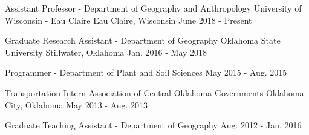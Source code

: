\begin{cventries}
  \cventry
    {Assistant Professor - Department of Geography and Anthropology}
    {University of Wisconsin - Eau Claire}
    {Eau Claire, Wisconsin}
    {June 2018 - Present}

  \cventry
    {Graduate Research Assistant - Department of Geography}
    {Oklahoma State University}
    {Stillwater, Oklahoma}
    {Jan. 2016 - May 2018}

  \cventry
    {Programmer - Department of Plant and Soil Sciences}
    {}
    {}
    {May 2015 - Aug. 2015}

  \cventry
    {Transportation Intern}
    {Association of Central Oklahoma Governments}
    {Oklahoma City, Oklahoma}
    {May 2013 - Aug. 2013}

  \cventry
    {Graduate Teaching Assistant - Department of Geography}
    {}
    {}
    {Aug. 2012 - Jan. 2016}

\end{cventries}